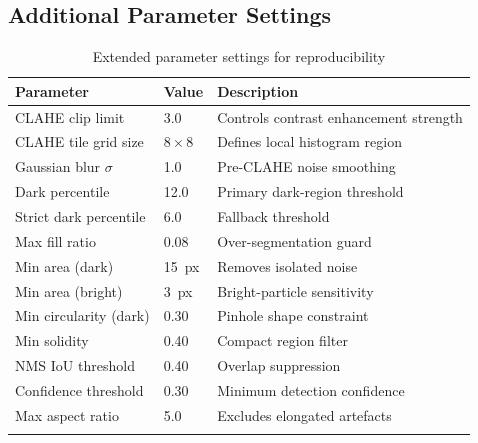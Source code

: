 \documentclass[pdflatex,sn-mathphys-num,iicol]{sn-jnl}
\theoremstyle{thmstyleone}
\theoremstyle{thmstyletwo}
\theoremstyle{thmstylethree}
\begin{document}
\begin{appendices}

\section{Additional Parameter Settings}\label{sec:appendix_parameters}

\begin{table}[h]
\caption{Extended parameter settings for reproducibility}
\label{tab:appendix_parameters}
\begin{tabular}{@{}lll@{}}
\toprule
Parameter & Value & Description \\
\midrule
CLAHE clip limit       & 3.0           & Controls contrast enhancement strength \\
CLAHE tile grid size   & $8\times8$    & Defines local histogram region \\
Gaussian blur $\sigma$ & 1.0           & Pre-CLAHE noise smoothing \\
Dark percentile        & 12.0          & Primary dark-region threshold \\
Strict dark percentile & 6.0           & Fallback threshold \\
Max fill ratio         & 0.08          & Over-segmentation guard \\
Min area (dark)        & 15~px         & Removes isolated noise \\
Min area (bright)      & 3~px          & Bright-particle sensitivity \\
Min circularity (dark) & 0.30          & Pinhole shape constraint \\
Min solidity           & 0.40          & Compact region filter \\
NMS IoU threshold      & 0.40          & Overlap suppression \\
Confidence threshold   & 0.30          & Minimum detection confidence \\
Max aspect ratio       & 5.0           & Excludes elongated artefacts \\
\botrule
\end{tabular}
\end{table}

\end{appendices}

\end{document}
